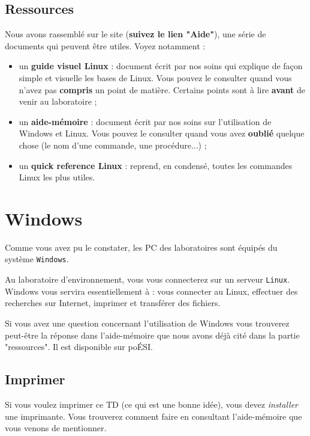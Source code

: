 \documentclass[a4paper,11pt]{article}
\begin{document}
\subsection{Ressources}
Nous avons rassemblé sur le site (\textbf{suivez le lien "Aide"}), une série de documents qui peuvent être utiles. Voyez notamment :
\par
\begin{itemize}
\item un \textbf{guide visuel Linux} : document écrit par nos soins qui explique de façon simple et visuelle les bases de Linux. Vous pouvez le consulter quand vous n'avez pas \textbf{compris} un point de matière. Certains points sont à lire \textbf{avant} de venir au laboratoire ;
\item un \textbf{aide-mémoire} : document écrit par nos soins sur l'utilisation de Windows et Linux. Vous pouvez le consulter quand vous avez \textbf{oublié} quelque chose (le nom d'une commande, une procédure...) ;
\item	un \textbf{quick reference Linux} : reprend, en condensé, toutes les commandes Linux les plus utiles. 
\end{itemize}


\section{Windows}

Comme vous avez pu le constater, les PC des laboratoires sont équipés du système \verb_Windows_.
\par			
Au laboratoire d'environnement, vous vous connecterez sur un serveur \verb_Linux_. Windows vous servira essentiellement à : vous connecter au Linux, 
effectuer des recherches sur Internet, imprimer et transférer des fichiers.
\par
Si vous avez une question concernant l'utilisation de Windows vous trouverez peut-être la réponse dans l'aide-mémoire que nous avons déjà cité dans la partie "ressources". Il est disponible sur poÉSI. 
\par		

\subsection{Imprimer}
Si vous voulez imprimer ce TD (ce qui est une bonne idée), vous devez \textit{installer} une imprimante. Vous trouverez comment faire en consultant l'aide-mémoire que vous venons de mentionner.
\par
\end{document}
